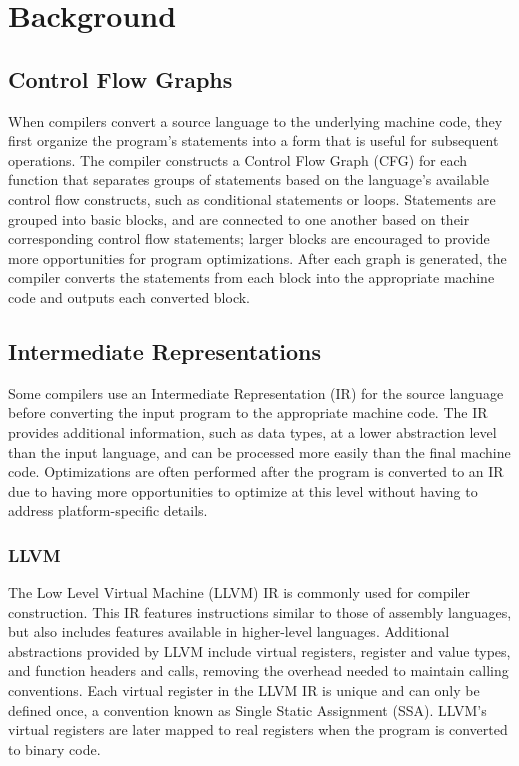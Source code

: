 \chapter{Background}

\section{Control Flow Graphs}
When compilers convert a source language to the underlying machine code, they first organize the program's statements into a form that is useful for subsequent operations. The compiler constructs a Control Flow Graph (CFG) for each function that separates groups of statements based on the language's available control flow constructs, such as conditional statements or loops. Statements are grouped into basic blocks, and are connected to one another based on their corresponding control flow statements; larger blocks are encouraged to provide more opportunities for program optimizations. After each graph is generated, the compiler converts the statements from each block into the appropriate machine code and outputs each converted block.

\section{Intermediate Representations}
Some compilers use an Intermediate Representation (IR) for the source language before converting the input program to the appropriate machine code. The IR provides additional information, such as data types, at a lower abstraction level than the input language, and can be processed more easily than the final machine code. Optimizations are often performed after the program is converted to an IR due to having more opportunities to optimize at this level without having to address platform-specific details.

\subsection{LLVM}
The Low Level Virtual Machine (LLVM) IR is commonly used for compiler construction. This IR features instructions similar to those of assembly languages, but also includes features available in higher-level languages. Additional abstractions provided by LLVM include virtual registers, register and value types, and function headers and calls, removing the overhead needed to maintain calling conventions. Each virtual register in the LLVM IR is unique and can only be defined once, a convention known as Single Static Assignment (SSA). LLVM's virtual registers are later mapped to real registers when the program is converted to binary code.

